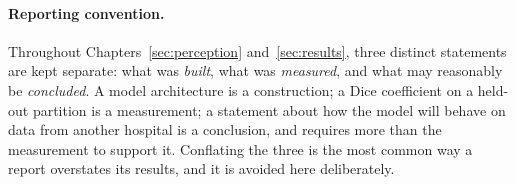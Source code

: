 \paragraph{Reporting convention.} Throughout Chapters~\ref{sec:perception}
and~\ref{sec:results}, three distinct statements are kept separate: what was
\textit{built}, what was \textit{measured}, and what may reasonably be \textit{concluded}.
A model architecture is a construction; a Dice coefficient on a held-out partition is a
measurement; a statement about how the model will behave on data from another hospital is
a conclusion, and requires more than the measurement to support it. Conflating the three
is the most common way a report overstates its results, and it is avoided here
deliberately.
